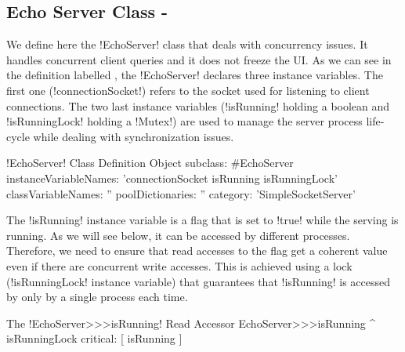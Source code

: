 \documentclass[a4paper,10pt,twoside]{book}
\begin{document}
%

\subsection{Echo Server Class - }\label{sec:echoServerClass}
We define here the \ct!EchoServer! class that deals with concurrency issues.
It handles concurrent client queries and it does not freeze the UI.
As we can see in the definition labelled , the \ct!EchoServer! declares three instance variables.
The first one (\ct!connectionSocket!) refers to the socket used for listening to client connections.
The two last instance variables (\ct!isRunning! holding a boolean and \ct!isRunningLock! holding a \ct!Mutex!) are used to manage the server process life-cycle while dealing with synchronization issues. 
 
\begin{classdef}[echoServerClassDef]{\ct!EchoServer! Class Definition}
Object subclass: #EchoServer
	instanceVariableNames: 'connectionSocket isRunning isRunningLock'
	classVariableNames: ''
	poolDictionaries: ''
	category: 'SimpleSocketServer'
\end{classdef}


The \ct!isRunning! instance variable is a flag that is set to \ct!true! while the serving is running.
As we will see below, it can be accessed by different processes.
Therefore, we need to ensure that read accesses to the flag get a coherent value even if there are concurrent write accesses.
This is achieved using a lock (\ct!isRunningLock! instance variable) that guarantees that \ct!isRunning! is accessed by only by a single process each time.

\begin{method}{The \ct!EchoServer>>>isRunning! Read Accessor}
EchoServer>>>isRunning
	^ isRunningLock critical: [ isRunning ]
\end{method}
\end{document}
